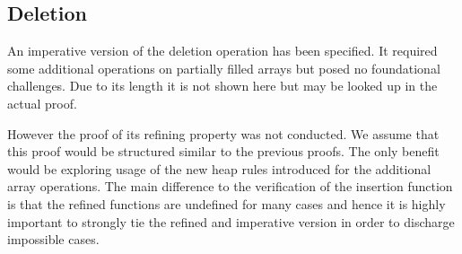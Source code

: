 \subsection{Deletion}

An imperative version of the deletion operation has been specified.
It required some additional operations on partially filled arrays but
posed no foundational challenges.
Due to its length it is not shown here but may be looked up in the
actual proof.

However the proof of its refining property was not conducted.
We assume that this proof would be structured similar to
the previous proofs.
The only benefit would be exploring usage of the new
heap rules introduced for the additional array operations.
The main difference to the verification of the
insertion function is that the refined functions
are undefined for many cases and hence it is highly important
to strongly tie the refined and imperative version
in order to discharge impossible cases.